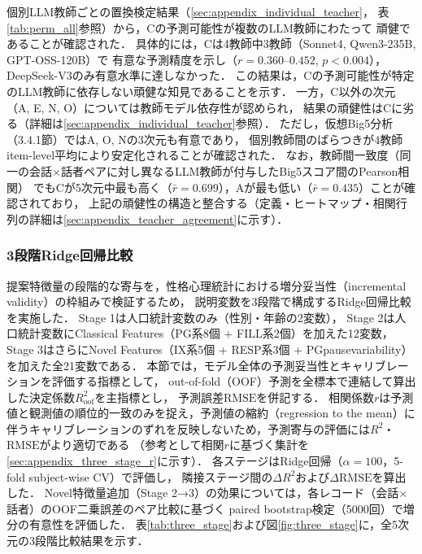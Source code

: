 \documentclass[dvipdfmx,11pt,a4paper]{bxjsarticle}
\renewcommand{\_}{\paperorigunderscore\allowbreak}%
\begin{document}
個別LLM教師ごとの置換検定結果（\ref{sec:appendix_individual_teacher}，
表\ref{tab:perm_all}参照）から，Cの予測可能性が複数のLLM教師にわたって
頑健であることが確認された．
具体的には，Cは4教師中3教師（Sonnet4, Qwen3-235B, GPT-OSS-120B）で
有意な予測精度を示し（$r = 0.360$--$0.452$, $p < 0.004$），
DeepSeek-V3のみ有意水準に達しなかった．
この結果は，Cの予測可能性が特定のLLM教師に依存しない頑健な知見であることを示す．
一方，C以外の次元（A, E, N, O）については教師モデル依存性が認められ，
結果の頑健性はCに劣る（詳細は\ref{sec:appendix_individual_teacher}参照）．
ただし，仮想Big5分析（3.4.1節）ではA, O, Nの3次元も有意であり，
個別教師間のばらつきが4教師item-level平均により安定化されることが確認された．
なお，教師間一致度（同一の会話$\times$話者ペアに対し異なるLLM教師が付与したBig5スコア間のPearson相関）
でもCが5次元中最も高く（$\bar{r} = 0.699$），Aが最も低い（$\bar{r} = 0.435$）ことが確認されており，
上記の頑健性の構造と整合する（定義・ヒートマップ・相関行列の詳細は\ref{sec:appendix_teacher_agreement}に示す）．\label{sec:result_agreement}

\subsubsection{3段階Ridge回帰比較}
\label{sec:result_three_stage}

提案特徴量の段階的な寄与を，性格心理統計における増分妥当性（incremental validity）の枠組みで検証するため，
説明変数を3段階で構成するRidge回帰比較を実施した．
Stage 1は人口統計変数のみ（性別・年齢の2変数），
Stage 2は人口統計変数にClassical Features（PG系8個 + FILL系2個）を加えた12変数，
Stage 3はさらにNovel Features（IX系5個 + RESP系3個 + PG\_pause\_variability）を加えた全21変数である．
本節では，モデル全体の予測妥当性とキャリブレーションを評価する指標として，
out-of-fold（OOF）予測を全標本で連結して算出した決定係数$R^2_{\text{oof}}$を主指標とし，
予測誤差$\text{RMSE}$を併記する．
相関係数$r$は予測値と観測値の順位的一致のみを捉え，予測値の縮約（regression to the mean）に
伴うキャリブレーションのずれを反映しないため，予測寄与の評価には$R^2$・$\text{RMSE}$がより適切である
（参考として相関$r$に基づく集計を\ref{sec:appendix_three_stage_r}に示す）．
各ステージはRidge回帰（$\alpha = 100$，5-fold subject-wise CV）で評価し，
隣接ステージ間の$\Delta R^2$および$\Delta\text{RMSE}$を算出した．
Novel特徴量追加（Stage 2→3）の効果については，各レコード（会話$\times$話者）のOOF二乗誤差のペア比較に基づく
paired bootstrap検定（5000回）で増分の有意性を評価した．
表\ref{tab:three_stage}および図\ref{fig:three_stage}に，全5次元の3段階比較結果を示す．
\end{document}
